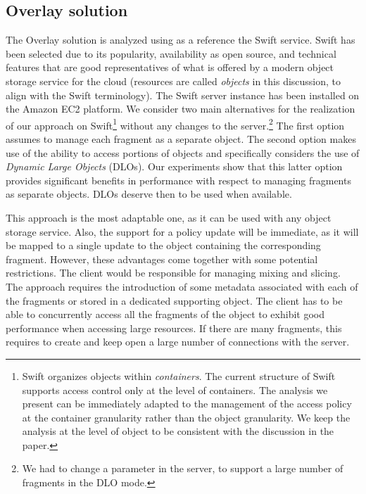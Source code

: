 \subsection{Overlay solution \label{ms:sec:overlay}}
The Overlay solution is analyzed using as a reference the Swift service. Swift has been selected due to its popularity, availability as open source, and technical features that are good representatives of what is offered by a modern object storage service for the cloud (resources are called {\em objects} in this discussion, to align with the Swift terminology). The Swift server instance has been installed on the Amazon EC2 platform. We consider two main alternatives for the realization of our approach on Swift\footnote{Swift organizes objects within {\em containers}. The current structure of Swift supports access control only at the level of containers. The analysis we present can be immediately adapted to the management of the access policy at the container granularity rather than the object granularity. We keep the analysis at the level of object to be consistent with the discussion in the paper.} without any changes to the server.\footnote{We had to change a parameter in the server, to support a large number of fragments in the DLO mode.} The first option assumes to manage each fragment as a separate object. The second option makes use of the ability to access portions of objects and specifically considers the use of {\em Dynamic Large Objects} (DLOs). Our experiments show that this latter option provides significant benefits in performance with respect to managing fragments as separate objects. DLOs deserve then to be used when available.

\medskip
{} This approach is the most adaptable one, as it can be used with any object storage service. Also, the support for a policy update will be immediate, as it will be mapped to a single update to the object containing the corresponding fragment. However, these advantages come together with some potential restrictions. The client would be responsible for managing mixing and slicing. The approach requires the introduction of some metadata associated with each of the fragments or stored in a dedicated supporting object. The client has to be able to concurrently access all the fragments of the object to exhibit good performance when accessing large resources. If there are many fragments, this requires to create and keep open a large number of connections with the server.

